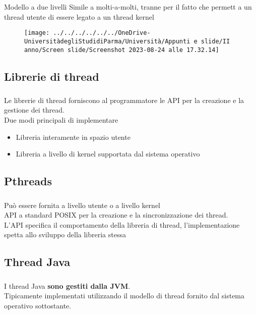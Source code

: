 \documentclass{beamer}
\newenvironment{mainframe}{
	\begin{frame}
		\frametitle{\insertsubsection}
		\framesubtitle{\insertsection}
	}{
	\end{frame}
}
\begin{document}
\begin{frame}{Modello a due livelli}
	Simile a molti-a-molti, tranne per il fatto che permett a un thread utente di essere legato a un thread kernel
	\begin{figure}
		\centering
		\texttt{[image: ../../../../../../OneDrive-UniversitàdegliStudidiParma/Università/Appunti e slide/II anno/Screen slide/Screenshot 2023-08-24 alle 17.32.14]}
	\end{figure}
\end{frame}
\subsection{Librerie di thread}
\begin{mainframe}
	Le librerie di thread forniscono al programmatore le API per la creazione e la gestione dei thread.\\
	Due modi principali di implementare
	\begin{itemize}
		\item Libreria interamente in spazio utente
		\item Libreria a livello di kernel supportata dal sistema operativo
	\end{itemize}
\end{mainframe}
\subsection{Pthreads}
\begin{mainframe}
	Può essere fornita a livello utente o a livello kernel\\
	API a standard POSIX per la creazione e la sincronizzazione dei thread.\\
	L'API specifica il comportamento della libreria di thread, l'implementazione spetta allo sviluppo della libreria stessa
\end{mainframe}
\subsection{Thread Java}
\begin{mainframe}
	I thread Java \textbf{sono gestiti dalla JVM}.\\
	Tipicamente implementati utilizzando il modello di thread fornito dal sistema operativo sottostante.
\end{mainframe}
\end{document}
